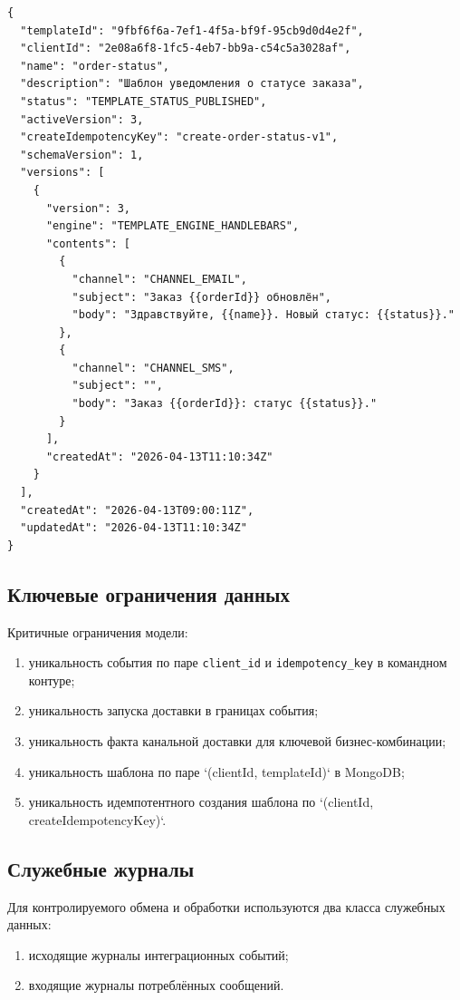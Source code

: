 \begin{verbatim}
{
  "templateId": "9fbf6f6a-7ef1-4f5a-bf9f-95cb9d0d4e2f",
  "clientId": "2e08a6f8-1fc5-4eb7-bb9a-c54c5a3028af",
  "name": "order-status",
  "description": "Шаблон уведомления о статусе заказа",
  "status": "TEMPLATE_STATUS_PUBLISHED",
  "activeVersion": 3,
  "createIdempotencyKey": "create-order-status-v1",
  "schemaVersion": 1,
  "versions": [
    {
      "version": 3,
      "engine": "TEMPLATE_ENGINE_HANDLEBARS",
      "contents": [
        {
          "channel": "CHANNEL_EMAIL",
          "subject": "Заказ {{orderId}} обновлён",
          "body": "Здравствуйте, {{name}}. Новый статус: {{status}}."
        },
        {
          "channel": "CHANNEL_SMS",
          "subject": "",
          "body": "Заказ {{orderId}}: статус {{status}}."
        }
      ],
      "createdAt": "2026-04-13T11:10:34Z"
    }
  ],
  "createdAt": "2026-04-13T09:00:11Z",
  "updatedAt": "2026-04-13T11:10:34Z"
}
\end{verbatim}

\subsection{Ключевые ограничения данных}

Критичные ограничения модели:
\begin{enumerate}
    \item уникальность события по паре \texttt{client\_id} и \texttt{idempotency\_key} в командном контуре;
    \item уникальность запуска доставки в границах события;
    \item уникальность факта канальной доставки для ключевой бизнес-комбинации;
    \item уникальность шаблона по паре `(clientId, templateId)` в MongoDB;
    \item уникальность идемпотентного создания шаблона по `(clientId, createIdempotencyKey)`.
\end{enumerate}

\subsection{Служебные журналы}

Для контролируемого обмена и обработки используются два класса служебных данных:
\begin{enumerate}
    \item исходящие журналы интеграционных событий;
    \item входящие журналы потреблённых сообщений.
\end{enumerate}

